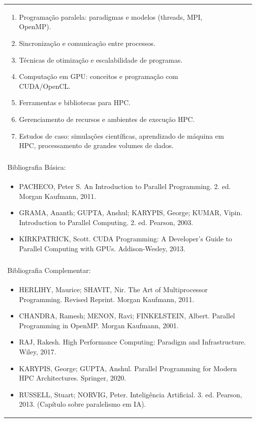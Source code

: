 \documentclass[11pt]{article}
\begin{document}
\begin{center}
\begin{longtable}{|p{4cm}|p{4cm}|p{4cm}|p{4cm}|}
{\begin{enumerate}
\item Programação paralela: paradigmas e modelos (threads, MPI, OpenMP).
\item Sincronização e comunicação entre processos.
\item Técnicas de otimização e escalabilidade de programas.
\item Computação em GPU: conceitos e programação com CUDA/OpenCL.
\item Ferramentas e bibliotecas para HPC.
\item Gerenciamento de recursos e ambientes de execução HPC.
\item Estudos de caso: simulações científicas, aprendizado de máquina em HPC, processamento de grandes volumes de dados.\end{enumerate}}\\
\multicolumn{4}{|p{16cm}|}{}\\
\hline
\multicolumn{4}{|p{16cm}|}{Bibliografia Básica:}\\
\multicolumn{4}{|p{16cm}|}{%
\begin{itemize}\item PACHECO, Peter S. An Introduction to Parallel Programming. 2. ed. Morgan Kaufmann, 2011.
\item GRAMA, Ananth; GUPTA, Anshul; KARYPIS, George; KUMAR, Vipin. Introduction to Parallel Computing. 2. ed. Pearson, 2003.
\item KIRKPATRICK, Scott. CUDA Programming: A Developer's Guide to Parallel Computing with GPUs. Addison-Wesley, 2013.\end{itemize}}\\
\multicolumn{4}{|p{16cm}|}{}\\
\hline
\multicolumn{4}{|p{16cm}|}{Bibliografia Complementar:}\\
\multicolumn{4}{|p{16cm}|}{%
\begin{itemize}\item HERLIHY, Maurice; SHAVIT, Nir. The Art of Multiprocessor Programming. Revised Reprint. Morgan Kaufmann, 2011.
\item CHANDRA, Ramesh; MENON, Ravi; FINKELSTEIN, Albert. Parallel Programming in OpenMP. Morgan Kaufmann, 2001.
\item RAJ, Rakesh. High Performance Computing: Paradigm and Infrastructure. Wiley, 2017.
\item KARYPIS, George; GUPTA, Anshul. Parallel Programming for Modern HPC Architectures. Springer, 2020.
\item RUSSELL, Stuart; NORVIG, Peter. Inteligência Artificial. 3. ed. Pearson, 2013. (Capítulo sobre paralelismo em IA).\end{itemize}}\\
\hline
\end{longtable}
\end{center}
\end{document}
